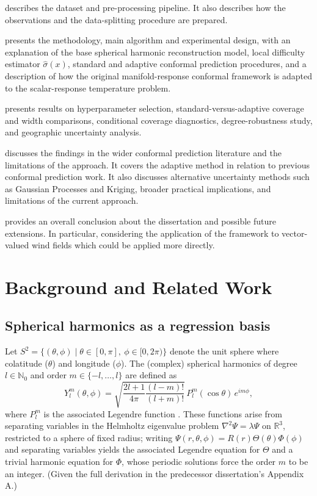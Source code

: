 \documentclass[11pt,a4paper]{report}
\begin{document}
 describes the dataset and pre-processing pipeline. It also describes how the observations and the data-splitting procedure are prepared.

 presents the methodology, main algorithm and experimental design, with an explanation of the base spherical harmonic reconstruction model, local difficulty estimator $\hat{\sigma}(x)$, standard and adaptive conformal prediction procedures, and a description of how the original manifold-response conformal framework is adapted to the scalar-response temperature problem. 

 presents results on hyperparameter selection, standard-versus-adaptive coverage and width comparisons, conditional coverage diagnostics, degree-robustness study, and geographic uncertainty analysis.

 discusses the findings in the wider conformal prediction literature and the limitations of the approach. It covers the adaptive method in relation to previous conformal prediction work. It also discusses alternative uncertainty methods such as Gaussian Processes and Kriging, broader practical implications, and limitations of the current approach.

 provides an overall conclusion about the dissertation and possible future extensions. In particular, considering the application of the framework to vector-valued wind fields which could be applied more directly. 

\chapter{Background and Related Work}
\label{ch:background}

\section{Spherical harmonics as a regression basis}
\label{sec:sh-background}
 
Let $S^2 = \{(\theta,\phi) \mid \theta \in [0,\pi],\ \phi \in [0,2\pi)\}$ denote the unit sphere where colatitude ($\theta$) and longitude ($\phi$). The (complex) spherical harmonics of degree $l \in \mathbb{N}_0$ and order $m \in \{-l,\dots,l\}$ are defined as
\begin{equation}
    Y_l^m(\theta,\phi) = \sqrt{\frac{2l+1}{4\pi}\frac{(l-m)!}{(l+m)!}}\, P_l^m(\cos\theta)\, e^{im\phi},
    \label{eq:sph-harm}
\end{equation}
where $P_l^m$ is the associated Legendre function \citep{thomas2025}. These functions arise from separating variables in the Helmholtz eigenvalue problem $\nabla^2\Psi = \lambda\Psi$ on $\mathbb{R}^3$, restricted to a sphere of fixed radius; writing $\Psi(r,\theta,\phi)=R(r)\Theta(\theta)\Phi(\phi)$ and separating variables yields the associated Legendre equation for $\Theta$ and a trivial harmonic equation for $\Phi$, whose periodic solutions force the order $m$ to be an integer. (Given the full derivation in the predecessor dissertation's Appendix A.)
 
\end{document}
